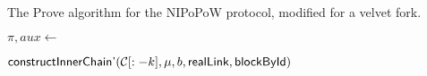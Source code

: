 \begin{algorithm}[H]
    \caption{\label{alg.nipopow-velvet-prover}The \textsf{Prove} algorithm
    for the NIPoPoW protocol, modified for a velvet fork.}
    \begin{algorithmic}[1]
            \Let{\tilde\Pi}{\emptyset}
                \State $\pi, aux \gets$
                    \begin{varwidth}[t]{\linewidth}
                        $\textsf{constructInnerChain'}
                        (\mathcal{C}[:-k], \mu, b, \textsf{realLink},
                        \textsf{blockById})$
                    \end{varwidth}
                \EndIf
            \EndFor
            \State\Return{$\tilde\Pi$}
        \EndFunction
    \vskip8pt
    \end{algorithmic}
\end{algorithm}
